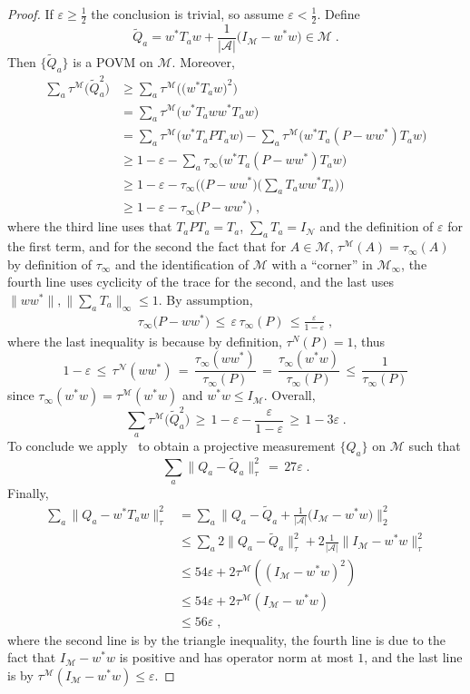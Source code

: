 \documentclass[11pt]{article}
\theoremstyle{definition}
\newcommand{\Id}{\ensuremath{I}}
\newcommand{\mA}{\ensuremath{\mathcal{A}}}
\newcommand{\mM}{\ensuremath{\mathcal{M}}}
\newcommand{\eps}{\varepsilon}
\newcommand{\mN}{\mathcal{N}}
\begin{document}
\begin{proof}
If $\eps\geq \frac{1}{2}$ the conclusion is trivial, so assume $\eps<\frac{1}{2}$. 
Define 
\[\tilde{Q}_a = w^* T_a w  + \frac{1}{|\mA|}\big(\Id_\mM - w^* w\big) \in \mM\;.\]
Then $\{\tilde{Q}_a\}$ is a POVM on $\mM$. Moreover, 
\begin{align*}
\sum_a \tau^\mM \big( \tilde{Q}_a^2 \big) &\geq \sum_a \tau^\mM \big( \big(w^* T_a w \big)^2 \big) \\
&= \sum_a \tau^\mM \big(  w^* T_a w w^*T_a w \big)\\
&= \sum_a \tau^\mM \big(  w^* T_a  P T_a w \big) - \sum_a \tau^\mM \big( w^* T_a  ( P - w w^*) T_a w \big)\\
&\geq 1 - \eps -  \sum_a \tau_\infty \big( w^* T_a  ( P - w w^*) T_a w \big)\\
&\geq 1 - \eps -  \tau_\infty\Big(\big( P - w w^*\big)\Big(\sum_a  T_a w w^* T_a\Big)\Big)\\ 
&\geq 1- \eps- \tau_\infty\big( P- w w^*\big)\;,
\end{align*}
where the third line uses that $T_aPT_a=T_a$, $\sum_a T_a = \Id_\mN$ and the definition of $\eps$ for the first term, and for the second the fact that for $A\in\mM$, $\tau^\mM(A)=\tau_\infty(A)$ by definition of $\tau_\infty$ and the identification of $\mM$ with a ``corner'' in $\mM_\infty$, the fourth line uses cyclicity of the trace for the second, and the last uses $\|ww^*\|,\|\sum_a T_a\|_\infty\leq 1$. By assumption, 
\begin{align*}
\tau_\infty\big( P- w w^*\big) \,\leq\, \eps\, \tau_\infty(P)\,\leq \frac{\eps}{1-\eps}\;,
\end{align*}
where the last inequality is because by definition, $\tau^N(P)=1$, thus
\[1-\eps \,\leq\, \tau^\mN(ww^*) \,=\, \frac{\tau_\infty(ww^*)}{\tau_\infty(P)}\,=\, \frac{\tau_\infty(w^*w)}{\tau_\infty(P)}  \,\leq\, \frac{1}{\tau_\infty(P)}\]
since $\tau_\infty(w^* w) = \tau^\mM(w^* w)$ and $w^*w\leq I_\mM$. Overall, 
\[ \sum_a \tau^\mM \big( \tilde{Q}_a^2 \big) \,\geq\, 1-\eps-\frac{\eps}{1-\eps}\,\geq\, 1-3\eps\;.\]
To conclude we apply~\cite[Theorem 1.2]{de2021orthogonalization} to obtain a projective measurement $\{Q_a\}$ on $\mM$ such that 
\begin{equation*}
\sum_a \big\|{Q}_a - \tilde{Q}_a \big\|^2_\tau \,=\, 27\eps\;.
\end{equation*}
Finally,
\begin{align*}
\sum_a \big\|{Q}_a - w^*{T}_a w\big\|^2_\tau &= \sum_a \Big\|{Q}_a - \tilde{Q}_a  + \frac{1}{|\mA|}\big(I_\mM - w^* w\big) \Big\|^2_2\\
&\leq  \sum_a 2\big\|{Q}_a - \tilde{Q}_a\big\|_\tau^2  + 2\frac{1}{|\mA|}\big\|I_\mM - w^* w\big\|_\tau^2 \\
&\leq 54 \eps + 2 \tau^\mM( (I_\mM - w^* w)^2 ) \\
&\leq 54 \eps + 2 \tau^\mM(I_\mM - w^* w ) \\
&\leq 56 \eps\;,
\end{align*}
where the second line is by the triangle inequality, the fourth line is due to the fact that $I_\mM - w^* w$ is positive and has operator norm at most $1$, and the last line is by $\tau^\mM(I_\mM - w^* w ) \leq \eps$.
\end{proof}
\end{document}
